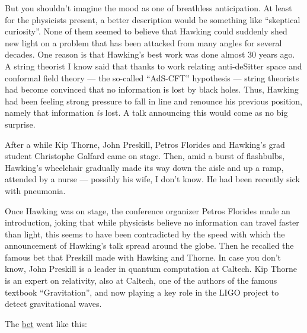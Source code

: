 \documentclass{article}
\begin{document}
But you shouldn't imagine the mood as one of breathless anticipation. At
least for the physicists present, a better description would be
something like ``skeptical curiosity''. None of them seemed to believe
that Hawking could suddenly shed new light on a problem that has been
attacked from many angles for several decades. One reason is that
Hawking's best work was done almost 30 years ago. A string theorist I
know said that thanks to work relating anti-deSitter space and conformal
field theory --- the so-called ``AdS-CFT'' hypothesis --- string
theorists had become convinced that no information is lost by black
holes. Thus, Hawking had been feeling strong pressure to fall in line
and renounce his previous position, namely that information \emph{is}
lost. A talk announcing this would come as no big surprise.

After a while Kip Thorne, John Preskill, Petros Florides and Hawking's
grad student Christophe Galfard came on stage. Then, amid a burst of
flashbulbs, Hawking's wheelchair gradually made its way down the aisle
and up a ramp, attended by a nurse --- possibly his wife, I don't know.
He had been recently sick with pneumonia.

Once Hawking was on stage, the conference organizer Petros Florides made
an introduction, joking that while physicists believe no information can
travel faster than light, this seems to have been contradicted by the
speed with which the announcement of Hawking's talk spread around the
globe. Then he recalled the famous bet that Preskill made with Hawking
and Thorne. In case you don't know, John Preskill is a leader in quantum
computation at Caltech. Kip Thorne is an expert on relativity, also at
Caltech, one of the authors of the famous textbook ``Gravitation'', and
now playing a key role in the LIGO project to detect gravitational
waves.

The \href{dublin/index.html\#hawking}{bet} went like this:
\end{document}

